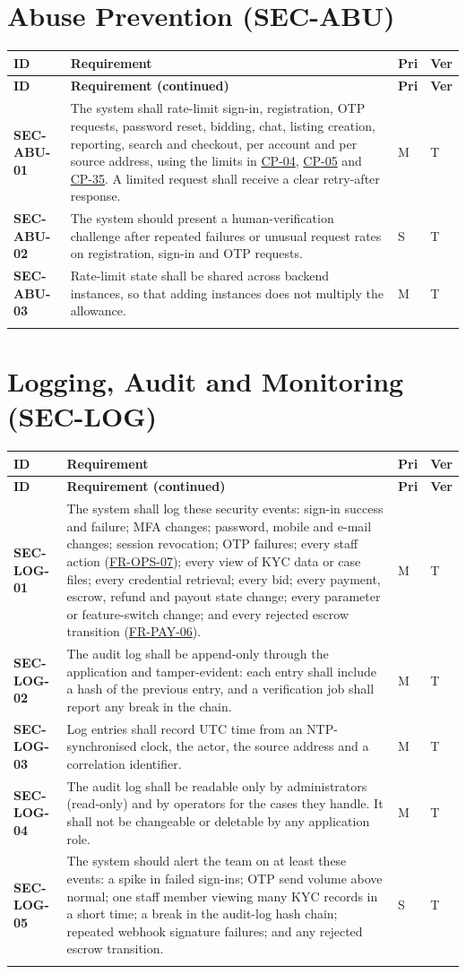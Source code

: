 \documentclass[11pt,a4paper]{report}
\makeatletter
\newenvironment{reqs}{%
  \small
  \begin{longtable}{@{}>{\raggedright\arraybackslash}p{2.35cm}
                       >{\raggedright\arraybackslash}p{10.3cm}
                       >{\centering\arraybackslash}p{0.7cm}
                       >{\centering\arraybackslash}p{0.7cm}@{}}
  \toprule
  \textbf{ID} & \textbf{Requirement} & \textbf{Pri} & \textbf{Ver} \\
  \midrule
  \endfirsthead
  \toprule
  \textbf{ID} & \textbf{Requirement (continued)} & \textbf{Pri} & \textbf{Ver} \\
  \midrule
  \endhead
  \bottomrule
  \endfoot
}{\end{longtable}}
\newcommand{\req}[5]{\leavevmode\textbf{#1}\hypertarget{#1}{} & #5 & #2 & #3 \\ \addlinespace[2pt]}
\newcommand{\rr}[1]{\hyperlink{#1}{#1}}
\newcommand{\cp}[1]{\hyperlink{#1}{#1}}
\makeatother
\begin{document}
\section{Abuse Prevention (SEC-ABU)}
\begin{reqs}
\req{SEC-ABU-01}{M}{T}{NFR-7, FR-88}{The system shall rate-limit sign-in, registration, OTP requests, password reset, bidding, chat, listing creation, reporting, search and checkout, per account and per source address, using the limits in \cp{CP-04}, \cp{CP-05} and \cp{CP-35}. A limited request shall receive a clear retry-after response.}
\req{SEC-ABU-02}{S}{T}{new}{The system should present a human-verification challenge after repeated failures or unusual request rates on registration, sign-in and OTP requests.}
\req{SEC-ABU-03}{M}{T}{new}{Rate-limit state shall be shared across backend instances, so that adding instances does not multiply the allowance.}
\end{reqs}

\section{Logging, Audit and Monitoring (SEC-LOG)}
\begin{reqs}
\req{SEC-LOG-01}{M}{T}{FR-90}{The system shall log these security events: sign-in success and failure; MFA changes; password, mobile and e-mail changes; session revocation; OTP failures; every staff action (\rr{FR-OPS-07}); every view of KYC data or case files; every credential retrieval; every bid; every payment, escrow, refund and payout state change; every parameter or feature-switch change; and every rejected escrow transition (\rr{FR-PAY-06}).}
\req{SEC-LOG-02}{M}{T}{FR-90}{The audit log shall be append-only through the application and tamper-evident: each entry shall include a hash of the previous entry, and a verification job shall report any break in the chain.}
\req{SEC-LOG-03}{M}{T}{new}{Log entries shall record UTC time from an NTP-synchronised clock, the actor, the source address and a correlation identifier.}
\req{SEC-LOG-04}{M}{T}{new}{The audit log shall be readable only by administrators (read-only) and by operators for the cases they handle. It shall not be changeable or deletable by any application role.}
\req{SEC-LOG-05}{S}{T}{new}{The system should alert the team on at least these events: a spike in failed sign-ins; OTP send volume above normal; one staff member viewing many KYC records in a short time; a break in the audit-log hash chain; repeated webhook signature failures; and any rejected escrow transition.}
\end{reqs}
\end{document}
